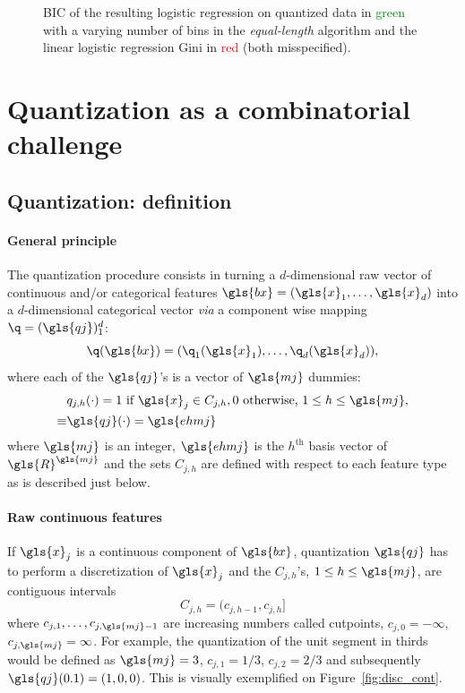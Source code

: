 \begin{figure}[!ht]
\centering \resizebox{.8\textwidth}{!}{}
\caption{\label{fig:bic_sin} BIC of the resulting logistic regression on quantized data in \textcolor{green}{green} with a varying number of bins in the \textit{equal-length} algorithm and the linear logistic regression Gini in \textcolor{red}{red} (both misspecified).}
\end{figure}


 
\section{Quantization as a combinatorial challenge} \label{sec:model_selection}

\subsection{Quantization: definition}

\paragraph{General principle}

The quantization procedure consists in turning a $d$-dimensional raw vector of continuous and/or categorical features $\gls{bx} = (\gls{x}_1, \ldots, \gls{x}_d)$ into a $d$-dimensional categorical vector \textit{via} a component wise mapping $\q=(\gls{qj})_1^d$:
\[\q(\gls{bx})=(\q_1(\gls{x}_1),\ldots,\q_d(\gls{x}_d)),\]
where each of the $\gls{qj}$'s is a vector of $\gls{mj}$ dummies: 
\begin{align}\label{eq:qj}
& q_{j,h}(\cdot) =  1 \text{ if } \gls{x}_j \in C_{j,h}, 0 \text{ otherwise, } 1 \leq h \leq \gls{mj}, \\
\equiv & \gls{qj}(\cdot) = \gls{ehmj} \nonumber
\end{align}
where $\gls{mj}$ is an integer, $\gls{ehmj}$ is the $h^{\text{th}}$ basis vector of $\gls{R}^{\gls{mj}}$ and the sets $C_{j,h}$ are defined with respect to each feature type as is described just below.
\paragraph{Raw continuous features} If $\gls{x}_j$ is a continuous component of $\gls{bx}$, quantization $\gls{qj}$ has to perform a discretization of $\gls{x}_j$ and the $C_{j,h}$'s, $1 \leq h \leq \gls{mj}$, are contiguous intervals  
\begin{equation}\label{eq:Cjhcont}
C_{j,h}=(c_{j,h-1},c_{j,h}]
\end{equation}
where $c_{j,1},\ldots,c_{j,\gls{mj}-1}$ are increasing numbers called cutpoints, $c_{j,0}=-\infty$, $c_{j,\gls{mj}}=\infty$. For example, the quantization of the unit segment in thirds would be defined as $\gls{mj}=3$, $c_{j,1} = 1/3$, $c_{j,2} = 2/3$ and subsequently $\gls{qj}(0.1) = (1,0,0)$. This is visually exemplified on Figure~\ref{fig:disc_cont}.
